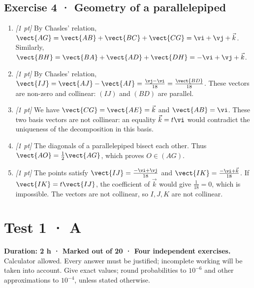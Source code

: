 \subsection*{Exercise 4 · Geometry of a parallelepiped}\begin{enumerate}

\item \textit{[1 pt]} By Chasles' relation, $\vect{AG}=\vect{AB}+\vect{BC}+\vect{CG}=\vi +\vj +\vec k$. Similarly, $\vect{BH}=\vect{BA}+\vect{AD}+\vect{DH}=-\vi +\vj +\vec k$.

\item \textit{[1 pt]} By Chasles' relation, $\vect{IJ}=\vect{AJ}-\vect{AI}=\frac{\vj -\vi }{18}=\frac{\vect{BD}}{18}$. These vectors are non-zero and collinear: $(IJ)$ and $(BD)$ are parallel.

\item \textit{[1 pt]} We have $\vect{CG}=\vect{AE}=\vec k$ and $\vect{AB}=\vi $. These two basis vectors are not collinear: an equality $\vec k=t\vi $ would contradict the uniqueness of the decomposition in this basis.

\item \textit{[1 pt]} The diagonals of a parallelepiped bisect each other. Thus $\vect{AO}=\frac12\vect{AG}$, which proves $O\in(AG)$.

\item \textit{[1 pt]} The points satisfy $\vect{IJ}=\frac{-\vi +\vj }{18}$ and $\vect{IK}=\frac{-\vi +\vec k}{18}$. If $\vect{IK}=t\vect{IJ}$, the coefficient of $\vec k$ would give $\frac{1}{18}=0$, which is impossible. The vectors are not collinear, so $I,J,K$ are not collinear.

\end{enumerate}

\fi

\ifmxteacher

\mxnewpage{}\label{sujet:1-3}

\section*{Test 1 · A}


\textbf{Duration: 2 h · Marked out of 20 · Four independent exercises.}\\Calculator allowed. Every answer must be justified; incomplete working will be taken into account. Give exact values; round probabilities to $10^{-6}$ and other approximations to $10^{-4}$, unless stated otherwise.

